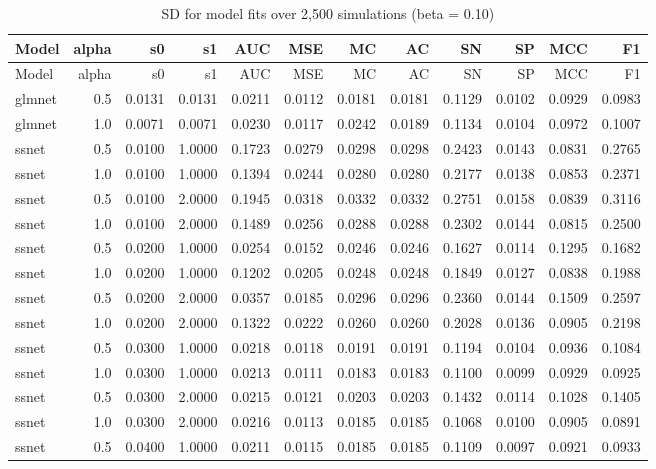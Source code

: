 \documentclass[
]{article}
\begin{document}
\begin{longtable}[]{@{}lrrrrrrrrrrr@{}}
\caption{SD for model fits over 2,500 simulations (beta =
0.10)}\tabularnewline
\toprule
Model & alpha & s0 & s1 & AUC & MSE & MC & AC & SN & SP & MCC & F1 \\
\midrule
\endfirsthead
\toprule
Model & alpha & s0 & s1 & AUC & MSE & MC & AC & SN & SP & MCC & F1 \\
\midrule
\endhead
glmnet & 0.5 & 0.0131 & 0.0131 & 0.0211 & 0.0112 & 0.0181 & 0.0181 &
0.1129 & 0.0102 & 0.0929 & 0.0983 \\
glmnet & 1.0 & 0.0071 & 0.0071 & 0.0230 & 0.0117 & 0.0242 & 0.0189 &
0.1134 & 0.0104 & 0.0972 & 0.1007 \\
ssnet & 0.5 & 0.0100 & 1.0000 & 0.1723 & 0.0279 & 0.0298 & 0.0298 &
0.2423 & 0.0143 & 0.0831 & 0.2765 \\
ssnet & 1.0 & 0.0100 & 1.0000 & 0.1394 & 0.0244 & 0.0280 & 0.0280 &
0.2177 & 0.0138 & 0.0853 & 0.2371 \\
ssnet & 0.5 & 0.0100 & 2.0000 & 0.1945 & 0.0318 & 0.0332 & 0.0332 &
0.2751 & 0.0158 & 0.0839 & 0.3116 \\
ssnet & 1.0 & 0.0100 & 2.0000 & 0.1489 & 0.0256 & 0.0288 & 0.0288 &
0.2302 & 0.0144 & 0.0815 & 0.2500 \\
ssnet & 0.5 & 0.0200 & 1.0000 & 0.0254 & 0.0152 & 0.0246 & 0.0246 &
0.1627 & 0.0114 & 0.1295 & 0.1682 \\
ssnet & 1.0 & 0.0200 & 1.0000 & 0.1202 & 0.0205 & 0.0248 & 0.0248 &
0.1849 & 0.0127 & 0.0838 & 0.1988 \\
ssnet & 0.5 & 0.0200 & 2.0000 & 0.0357 & 0.0185 & 0.0296 & 0.0296 &
0.2360 & 0.0144 & 0.1509 & 0.2597 \\
ssnet & 1.0 & 0.0200 & 2.0000 & 0.1322 & 0.0222 & 0.0260 & 0.0260 &
0.2028 & 0.0136 & 0.0905 & 0.2198 \\
ssnet & 0.5 & 0.0300 & 1.0000 & 0.0218 & 0.0118 & 0.0191 & 0.0191 &
0.1194 & 0.0104 & 0.0936 & 0.1084 \\
ssnet & 1.0 & 0.0300 & 1.0000 & 0.0213 & 0.0111 & 0.0183 & 0.0183 &
0.1100 & 0.0099 & 0.0929 & 0.0925 \\
ssnet & 0.5 & 0.0300 & 2.0000 & 0.0215 & 0.0121 & 0.0203 & 0.0203 &
0.1432 & 0.0114 & 0.1028 & 0.1405 \\
ssnet & 1.0 & 0.0300 & 2.0000 & 0.0216 & 0.0113 & 0.0185 & 0.0185 &
0.1068 & 0.0100 & 0.0905 & 0.0891 \\
ssnet & 0.5 & 0.0400 & 1.0000 & 0.0211 & 0.0115 & 0.0185 & 0.0185 &
0.1109 & 0.0097 & 0.0921 & 0.0933 \\

\end{longtable}
\end{document}
